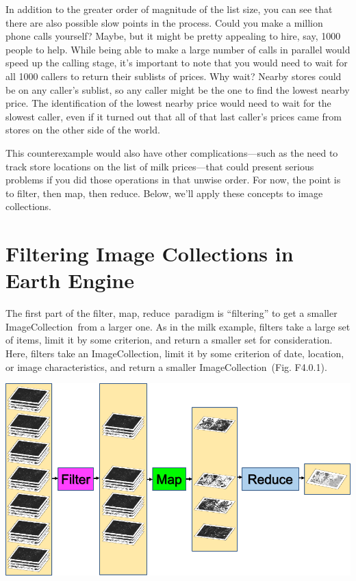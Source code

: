 \documentclass[
  letterpaper,
  DIV=11,
  numbers=noendperiod]{scrreprt}
\begin{document}
In addition to the greater order of magnitude of the list size, you can
see that there are also possible slow points in the process. Could you
make a million phone calls yourself? Maybe, but it might be pretty
appealing to hire, say, 1000 people to help. While being able to make a
large number of calls in parallel would speed up the calling stage, it's
important to note that you would need to wait for all 1000 callers to
return their sublists of prices. Why wait? Nearby stores could be on any
caller's sublist, so any caller might be the one to find the lowest
nearby price. The identification of the lowest nearby price would need
to wait for the slowest caller, even if it turned out that all of that
last caller's prices came from stores on the other side of the world.

This counterexample would also have other complications---such as the
need to track store locations on the list of milk prices---that could
present serious problems if you did those operations in that unwise
order. For now, the point is to filter, then map, then reduce. Below,
we'll apply these concepts to image collections.

\hypertarget{filtering-image-collections-in-earth-engine}{%
\section{Filtering Image Collections in Earth
Engine}\label{filtering-image-collections-in-earth-engine}}

The first part of the filter, map, reduce~paradigm is ``filtering'' to
get a smaller ImageCollection~from a larger one. As in the milk example,
filters take a large set of items, limit it by some criterion, and
return a smaller set for consideration. Here, filters take an
ImageCollection, limit it by some criterion of date, location, or image
characteristics, and return a smaller ImageCollection~(Fig. F4.0.1).

\includegraphics{./F4/image66.png}
\end{document}
